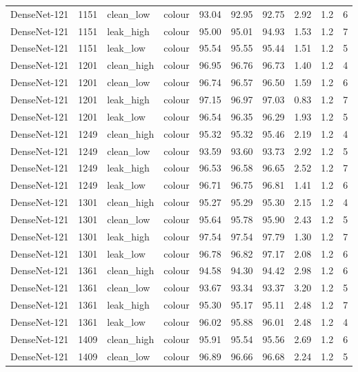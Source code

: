{\begin{longtable}{lrllrrrrrr}
DenseNet-121 & 1151 & clean\_low & colour & 93.04 & 92.95 & 92.75 & 2.92 & 1.2 & 6 \\
DenseNet-121 & 1151 & leak\_high & colour & 95.00 & 95.01 & 94.93 & 1.53 & 1.2 & 7 \\
DenseNet-121 & 1151 & leak\_low & colour & 95.54 & 95.55 & 95.44 & 1.51 & 1.2 & 5 \\
DenseNet-121 & 1201 & clean\_high & colour & 96.95 & 96.76 & 96.73 & 1.40 & 1.2 & 4 \\
DenseNet-121 & 1201 & clean\_low & colour & 96.74 & 96.57 & 96.50 & 1.59 & 1.2 & 6 \\
DenseNet-121 & 1201 & leak\_high & colour & 97.15 & 96.97 & 97.03 & 0.83 & 1.2 & 7 \\
DenseNet-121 & 1201 & leak\_low & colour & 96.54 & 96.35 & 96.29 & 1.93 & 1.2 & 5 \\
DenseNet-121 & 1249 & clean\_high & colour & 95.32 & 95.32 & 95.46 & 2.19 & 1.2 & 4 \\
DenseNet-121 & 1249 & clean\_low & colour & 93.59 & 93.60 & 93.73 & 2.92 & 1.2 & 5 \\
DenseNet-121 & 1249 & leak\_high & colour & 96.53 & 96.58 & 96.65 & 2.52 & 1.2 & 7 \\
DenseNet-121 & 1249 & leak\_low & colour & 96.71 & 96.75 & 96.81 & 1.41 & 1.2 & 6 \\
DenseNet-121 & 1301 & clean\_high & colour & 95.27 & 95.29 & 95.30 & 2.15 & 1.2 & 4 \\
DenseNet-121 & 1301 & clean\_low & colour & 95.64 & 95.78 & 95.90 & 2.43 & 1.2 & 5 \\
DenseNet-121 & 1301 & leak\_high & colour & 97.54 & 97.54 & 97.79 & 1.30 & 1.2 & 7 \\
DenseNet-121 & 1301 & leak\_low & colour & 96.78 & 96.82 & 97.17 & 2.08 & 1.2 & 6 \\
DenseNet-121 & 1361 & clean\_high & colour & 94.58 & 94.30 & 94.42 & 2.98 & 1.2 & 6 \\
DenseNet-121 & 1361 & clean\_low & colour & 93.67 & 93.34 & 93.37 & 3.20 & 1.2 & 5 \\
DenseNet-121 & 1361 & leak\_high & colour & 95.30 & 95.17 & 95.11 & 2.48 & 1.2 & 7 \\
DenseNet-121 & 1361 & leak\_low & colour & 96.02 & 95.88 & 96.01 & 2.48 & 1.2 & 4 \\
DenseNet-121 & 1409 & clean\_high & colour & 95.91 & 95.54 & 95.56 & 2.69 & 1.2 & 6 \\
DenseNet-121 & 1409 & clean\_low & colour & 96.89 & 96.66 & 96.68 & 2.24 & 1.2 & 5 \\

\end{longtable}}

